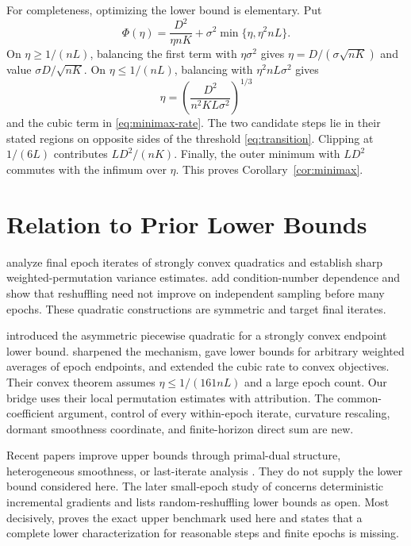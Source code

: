 \documentclass[twoside]{article}
\begin{document}
For completeness, optimizing the lower bound is elementary. Put
\[
 \Phi(\eta)=\frac{D^2}{\eta nK}
 +\sigma^2\min\{\eta,\eta^2nL\}.
\]
On $\eta\ge1/(nL)$, balancing the first term with $\eta\sigma^2$ gives
$\eta=D/(\sigma\sqrt{nK})$ and value
$\sigma D/\sqrt{nK}$. On $\eta\le1/(nL)$, balancing with
$\eta^2nL\sigma^2$ gives
\begin{equation}
 \eta=\left(\frac{D^2}{n^2KL\sigma^2}\right)^{1/3}
 \label{eq:eta-cubic}
\end{equation}
and the cubic term in \eqref{eq:minimax-rate}. The two candidate steps lie in
their stated regions on opposite sides of the threshold
\eqref{eq:transition}. Clipping at $1/(6L)$ contributes $LD^2/(nK)$.
Finally, the outer minimum with $LD^2$ commutes with the infimum over $\eta$.
This proves Corollary~\ref{cor:minimax}.

\section{Relation to Prior Lower Bounds}
\label{sec:related}

\citet{safran2020good} analyze final epoch iterates of strongly convex
quadratics and establish sharp weighted-permutation variance estimates.
\citet{safran2021many} add condition-number dependence and show that
reshuffling need not improve on independent sampling before many epochs.
These quadratic constructions are symmetric and target final iterates.

\citet{rajput2020closing} introduced the asymmetric piecewise quadratic for a
strongly convex endpoint lower bound. \citet{cha2023tighter} sharpened the
mechanism, gave lower bounds for arbitrary weighted averages of epoch
endpoints, and extended the cubic rate to convex objectives. Their convex
theorem assumes $\eta\le1/(161nL)$ and a large epoch count. Our bridge uses
their local permutation estimates with attribution. The common-coefficient
argument, control of every within-epoch iterate, curvature rescaling, dormant
smoothness coordinate, and finite-horizon direct sum are new.

Recent papers improve upper bounds through primal-dual structure, heterogeneous
smoothness, or last-iterate analysis \citep{cai2024tighter,liu2024last}.
They do not supply the lower bound considered here. The later small-epoch study
of \citet{kim2025incremental} concerns deterministic incremental gradients and
lists random-reshuffling lower bounds as open. Most decisively,
\citet{liu2026dominates} proves the exact upper benchmark used here and states
that a complete lower characterization for reasonable steps and finite epochs
is missing.
\end{document}
